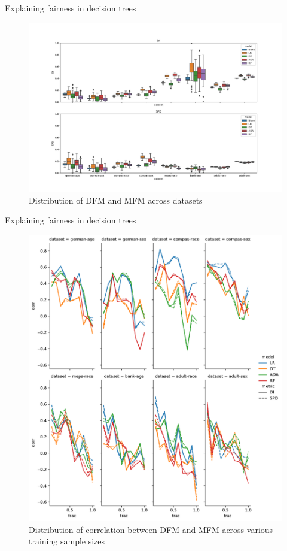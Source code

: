 \documentclass[aspectratio=169]{beamer}
\begin{document}
\begin{frame}{Explaining fairness in decision trees}
  \begin{figure}
    \centering
    \includegraphics[height=0.7\textheight,keepaspectratio]{boxplot--dataset--di-spd--exp-full.pdf}
    \caption{Distribution of DFM and MFM across datasets}
  \end{figure}
\end{frame}

\begin{frame}{Explaining fairness in decision trees}
  \begin{figure}
    \centering
    \includegraphics[height=0.7\textheight, keepaspectratio]{lineplot--frac--corr.pdf}
    \caption{Distribution of correlation between DFM and MFM across
      various training sample sizes}
  \end{figure}
\end{frame}
\end{document}
